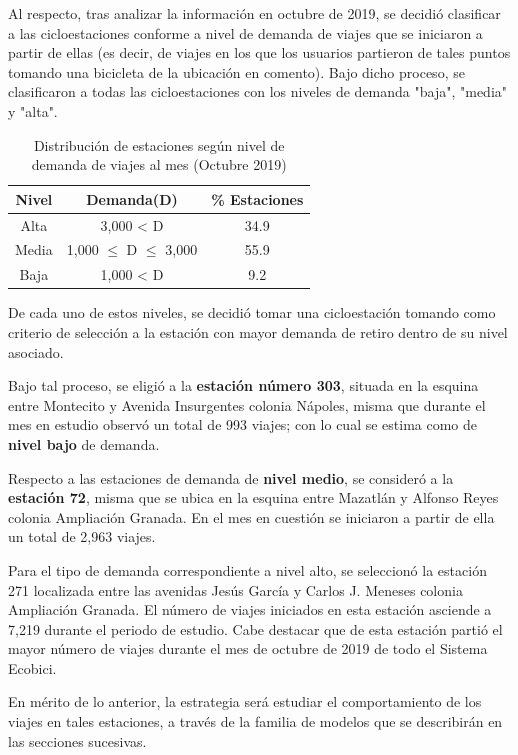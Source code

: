 \documentclass[9pt,twocolumn,twoside]{ilcss}
\begin{document}
Al respecto, tras analizar la información en octubre de 2019, se decidió clasificar a las cicloestaciones conforme a nivel de demanda de viajes que se iniciaron a partir de ellas (es decir, de viajes en los que los usuarios partieron de tales puntos tomando una bicicleta de la ubicación en comento). Bajo dicho proceso, se clasificaron a todas las cicloestaciones con los niveles de demanda "baja", "media" y "alta". 

\begin{table}[tbhp]
		\centering
	\caption{Distribución de estaciones según nivel de demanda de viajes al mes (Octubre 2019)}
	\begin{tabular}{@{}ccc@{}}
		\toprule
		Nivel & Demanda(D)                     & \multicolumn{1}{c}{\% Estaciones} \\ \midrule
		Alta  & 3,000 < D               & 34.9         \\
		Media & 1,000 $\leq$ D $\leq$ 3,000 & 55.9         \\
		Baja  & 1,000 < D                & 9.2       \\ \bottomrule
	\end{tabular}
\end{table}

De cada uno de estos niveles, se decidió tomar una cicloestación tomando como criterio de selección a la estación con mayor demanda de retiro dentro de su nivel asociado. 

Bajo tal proceso, se eligió a la \textbf{estación número 303}, situada en la esquina entre Montecito y Avenida Insurgentes colonia Nápoles, misma que durante el mes en estudio observó un total de 993 viajes; con lo cual se estima como de \textbf{nivel bajo} de demanda.

Respecto a las estaciones de demanda de \textbf{nivel medio}, se consideró a la \textbf{estación 72}, misma que se ubica en la esquina entre Mazatlán y Alfonso Reyes colonia Ampliación Granada. En el mes en cuestión se iniciaron a partir de ella un total de 2,963 viajes.

Para el tipo de demanda correspondiente a nivel alto, se seleccionó la estación 271 localizada entre las avenidas Jesús García y Carlos J. Meneses colonia Ampliación Granada. El número de viajes iniciados en esta estación asciende a 7,219 durante el periodo de estudio. Cabe destacar que de esta estación partió el mayor número de viajes durante el mes de octubre de 2019 de todo el Sistema Ecobici. 

En mérito de lo anterior, la estrategia será estudiar el comportamiento de los viajes en tales estaciones, a través de la familia de modelos que se describirán en las secciones sucesivas.
\end{document}
